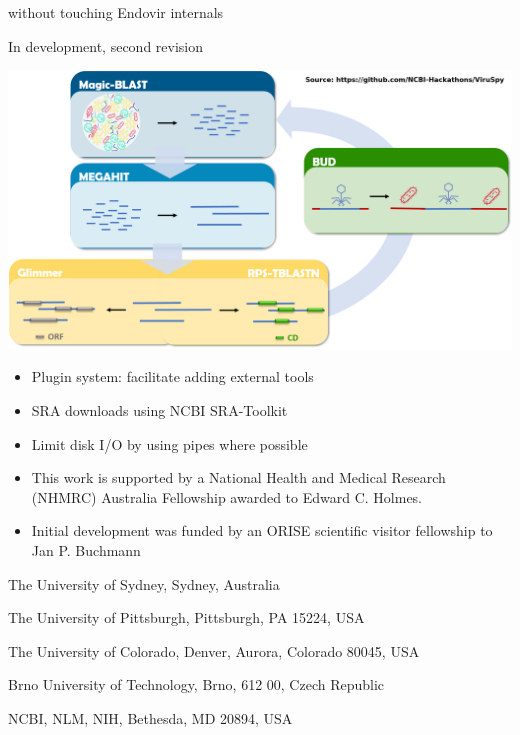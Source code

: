 \documentclass[final, a0paper, portrait]{baposter}
\newcommand{\compresslist}{
    \setlength{\itemsep}{1pt}
    \setlength{\parskip}{0pt}
    \setlength{\parsep}{0pt}
}
\begin{document}
\begin{poster}
{\begin{minipage}{0.6\textwidth}
\begin{description}
                        without touching Endovir internals
      \item[Status] In development, second revision
    \end{description}
  \end{minipage}
  \begin{minipage}{0.4\textwidth}
    \includegraphics[width=0.7\linewidth]{figs/bud_algo_0.jpg}
  \end{minipage}
}
{
  \begin{minipage}{0.75\linewidth}
    \resizebox{\linewidth}{!}{}
  \end{minipage}
  \begin{minipage}{0.2\linewidth}
    \begin{itemize}
      \compresslist
        \item Plugin system: facilitate adding external tools
        \item SRA downloads using NCBI SRA-Toolkit
        \item Limit disk I/O by using pipes where possible
    \end{itemize}
  \end{minipage}

}


{\small
  \begin{itemize}
   \item This work is supported by a National Health and Medical Research (NHMRC)
          Australia Fellowship awarded to Edward C. Holmes.
   \item Initial development was funded by an ORISE scientific visitor
         fellowship to  Jan P. Buchmann
  \end{itemize}
}
{
  \small
  \begin{description}
   \compresslist
    \item[0] The University of Sydney, Sydney, Australia
    \item[1] The University of Pittsburgh, Pittsburgh, PA 15224, USA
    \item[2] The University of Colorado, Denver, Aurora, Colorado 80045, USA
    \item[3] Brno University of Technology, Brno, 612 00, Czech Republic
    \item[4] NCBI, NLM, NIH, Bethesda, MD 20894, USA
  \end{description}
}

 \end{poster}
\end{document}
